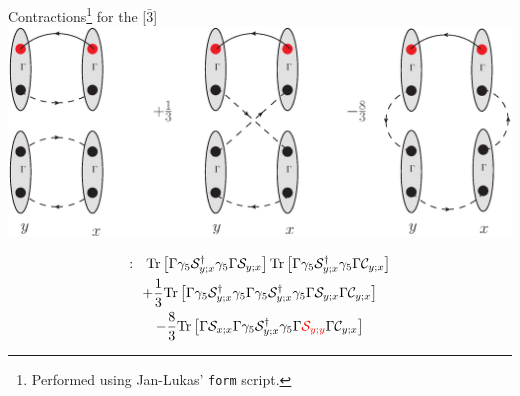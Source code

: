 \documentclass{beamer}
\begin{document}
\begin{frame}{Contractions\footnote{Performed using Jan-Lukas' \texttt{form} script.} for the [$\bar{3}$]}
\center
\includegraphics[width=.8\columnwidth]{../notes/contract2.eps}

\footnotesize
\begin{multline*}
[\bar{3}]:\ \ \text{Tr}\left[\Gamma \gamma_5\mathcal{S}_{y; x}^\dag\gamma_5\Gamma\mathcal{S}_{y;x}\right]
\text{Tr}\left[\Gamma \gamma_5\mathcal{S}_{y; x}^\dag\gamma_5\Gamma\mathcal{C}_{y; x}\right]\\
+\frac{1}{3}\text{Tr}\left[\Gamma \gamma_5\mathcal{S}_{y; x}^\dag\gamma_5\Gamma\gamma_5\mathcal{S}^\dag_{y; x}\gamma_5\Gamma \mathcal{S}_{y; x}\Gamma\mathcal{C}_{y; x}\right]\\
-\frac{8}{3}\text{Tr}\left[\Gamma \mathcal{S}_{x; x}\Gamma\gamma_5\mathcal{S}^\dag_{y; x}\gamma_5\Gamma {\color{red}\mathcal{S}_{y; y}}\Gamma\mathcal{C}_{y; x}\right]
\end{multline*}
\end{frame}


%
\end{document}
